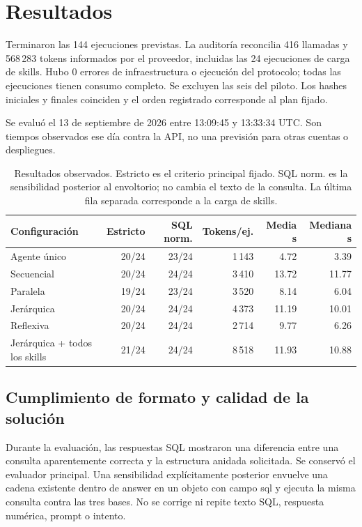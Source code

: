 \section{Resultados}
Terminaron las 144 ejecuciones previstas. La auditoría reconcilia 416 llamadas y 568\,283 tokens informados por el proveedor, incluidas las 24 ejecuciones de carga de skills. Hubo 0 errores de infraestructura o ejecución del protocolo; todas las ejecuciones tienen consumo completo. Se excluyen las seis del piloto. Los hashes iniciales y finales coinciden y el orden registrado corresponde al plan fijado.

Se evaluó el 13 de septiembre de 2026 entre 13:09:45 y 13:33:34 UTC. Son tiempos observados ese día contra la API, no una previsión para otras cuentas o despliegues.

\begin{table}[htbp]
\centering\small
\setlength{\tabcolsep}{4pt}
\begin{tabular}{@{}lrrrrr@{}}
\toprule
\textbf{Configuración} & \textbf{Estricto} & \textbf{SQL norm.} & \textbf{Tokens/ej.} & \textbf{Media s} & \textbf{Mediana s}\\
\midrule
Agente único & 20/24 & 23/24 & 1\,143 & 4.72 & 3.39\\
Secuencial & 20/24 & 24/24 & 3\,410 & 13.72 & 11.77\\
Paralela & 19/24 & 23/24 & 3\,520 & 8.14 & 6.04\\
Jerárquica & 20/24 & 24/24 & 4\,373 & 11.19 & 10.01\\
Reflexiva & 20/24 & 24/24 & 2\,714 & 9.77 & 6.26\\
\midrule
Jerárquica + todos los skills & 21/24 & 24/24 & 8\,518 & 11.93 & 10.88\\
\bottomrule
\end{tabular}
\caption{Resultados observados. Estricto es el criterio principal fijado. SQL norm. es la sensibilidad posterior al envoltorio; no cambia el texto de la consulta. La última fila separada corresponde a la carga de skills.}
\label{tab:results}
\end{table}

\subsection{Cumplimiento de formato y calidad de la solución}
Durante la evaluación, las respuestas SQL mostraron una diferencia entre una consulta aparentemente correcta y la estructura anidada solicitada. Se conservó el evaluador principal. Una sensibilidad explícitamente posterior envuelve una cadena existente dentro de answer en un objeto con campo sql y ejecuta la misma consulta contra las tres bases. No se corrige ni repite texto SQL, respuesta numérica, prompt o intento.

